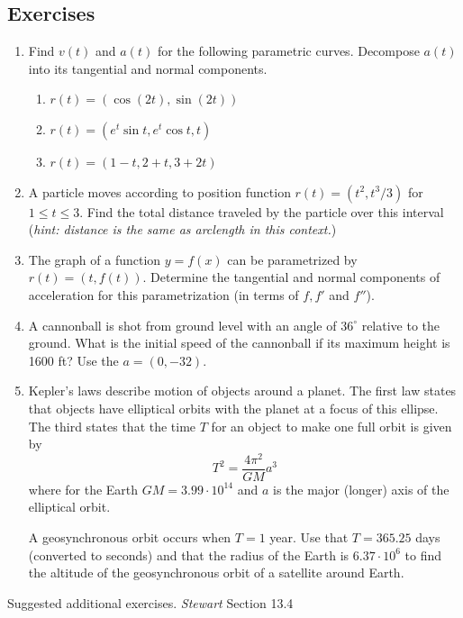 \documentclass[12pt]{article}
\numberwithin{equation}{subsection}
\numberwithin{figure}{subsection}
\theoremstyle{note}
\begin{document}
{\subsection{Exercises}  
\begin{enumerate}[label=\arabic*.]

\item Find  $v(t)$ and $a(t)$ for the following parametric curves. Decompose $a(t)$ into its tangential and normal components. 
\begin{enumerate}
	\item $r(t)=(\cos(2t), \sin(2t))$
	\item $r(t)=(e^t \sin t, e^t \cos t, t)$
	\item $r(t)=(1-t, 2+t, 3+2t)$
\end{enumerate} 

\item A particle moves according to position function $r(t)=(t^2, t^3/3)$ for $1\leq t\leq 3$. Find the total distance traveled by the particle over this interval (\textit{hint: distance is the same as arclength in this context.})

\item The graph of a function $y=f(x)$ can be parametrized by $r(t)=(t,f(t))$. Determine the tangential and normal components of acceleration for this parametrization (in terms of $f, f'$ and $f''$).

\item A cannonball is shot from ground level with an angle of $36^{\circ}$ relative to the ground. What is the initial speed of the cannonball if its maximum height is 1600 ft? Use the $a=(0, -32)$. 

\item Kepler's laws describe motion of objects around a planet. The first law states that objects have elliptical orbits with the planet at a focus of this ellipse. The third states that the time $T$ for an object to make one full orbit is given by \[ T^2=\dfrac{4\pi^2}{GM}a^3\] where for the Earth $GM=3.99\cdot 10^{14}$ and $a$ is the major (longer) axis of the elliptical orbit. 

A geosynchronous orbit occurs when $T=1$ year. Use that $T=365.25$ days (converted to seconds) and that the radius of the Earth is $6.37\cdot 10^{6}$ to find the altitude of the geosynchronous orbit of a satellite around Earth. 

\end{enumerate}
Suggested additional exercises. \textit{Stewart} Section 13.4



}
\end{document}
